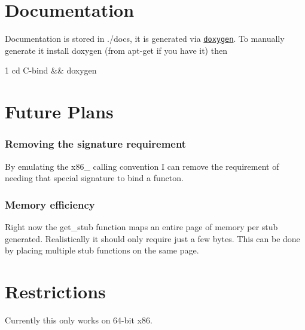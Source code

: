 \section*{Documentation}

Documentation is stored in {\ttfamily ./docs}, it is generated via \href{http://www.doxygen.nl/}{\tt doxygen}. To manually generate it install doxygen (from {\ttfamily apt-\/get} if you have it) then 
\begin{DoxyCode}
1 cd C-bind && doxygen
\end{DoxyCode}


\section*{Future Plans}

\subsubsection*{Removing the signature requirement}

By emulating the {\ttfamily x86\+\_} calling convention I can remove the requirement of needing that special signature to bind a functon.

\subsubsection*{Memory efficiency}

Right now the {\ttfamily get\+\_\+stub} function maps an entire page of memory per stub generated. Realistically it should only require just a few bytes. This can be done by placing multiple stub functions on the same page.

\section*{Restrictions}

Currently this only works on 64-\/bit {\ttfamily x86}. 